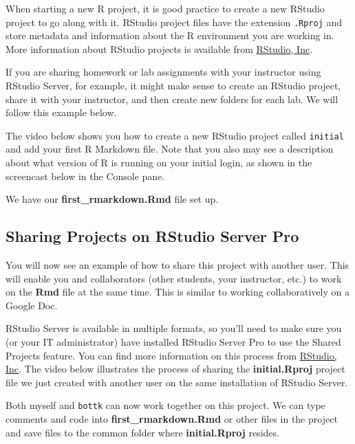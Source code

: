 \documentclass[]{tufte-book}
\begin{document}
When starting a new R project, it is good practice to create a new RStudio project to go along with it. RStudio project files have the extension \texttt{.Rproj} and store metadata and information about the R environment you are working in. More information about RStudio projects is available from \href{https://support.rstudio.com/hc/en-us/articles/200526207-Using-Projects}{RStudio, Inc}.

If you are sharing homework or lab assignments with your instructor using RStudio Server, for example, it might make sense to create an RStudio project, share it with your instructor, and then create new folders for each lab. We will follow this example below.

The video below shows you how to create a new RStudio project called \texttt{initial} and add your first R Markdown file. Note that you also may see a description about what version of R is running on your initial login, as shown in the screencast below in the Console pane.

We have our \textbf{first\_rmarkdown.Rmd} file set up.

\hypertarget{sharing-projects-on-rstudio-server-pro}{%
\subsection{Sharing Projects on RStudio Server Pro}\label{sharing-projects-on-rstudio-server-pro}}

You will now see an example of how to share this project with another user. This will enable you and collaborators (other students, your instructor, etc.) to work on the \textbf{Rmd} file at the same time. This is similar to working collaboratively on a Google Doc.

RStudio Server is available in multiple formats, so you'll need to make sure you (or your IT administrator) have installed RStudio Server Pro to use the Shared Projects feature. You can find more information on this process from \href{https://support.rstudio.com/hc/en-us/articles/211659737-Sharing-Projects-in-RStudio-Server-Pro}{RStudio, Inc}. The video below illustrates the process of sharing the \textbf{initial.Rproj} project file we just created with another user on the same installation of RStudio Server.

Both myself and \texttt{bottk} can now work together on this project. We can type comments and code into \textbf{first\_rmarkdown.Rmd} or other files in the project and save files to the common folder where \textbf{initial.Rproj} resides.
\end{document}
